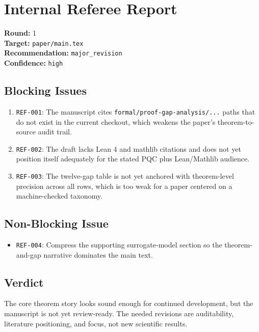\documentclass[11pt]{article}
\begin{document}
\section*{Internal Referee Report}

\textbf{Round:} 1\\
\textbf{Target:} \texttt{paper/main.tex}\\
\textbf{Recommendation:} \texttt{major\_revision}\\
\textbf{Confidence:} \texttt{high}

\subsection*{Blocking Issues}

\begin{enumerate}
\item \texttt{REF-001}: The manuscript cites \texttt{formal/proof-gap-analysis/...} paths that do not exist in the current checkout, which weakens the paper's theorem-to-source audit trail.
\item \texttt{REF-002}: The draft lacks Lean 4 and mathlib citations and does not yet position itself adequately for the stated PQC plus Lean/Mathlib audience.
\item \texttt{REF-003}: The twelve-gap table is not yet anchored with theorem-level precision across all rows, which is too weak for a paper centered on a machine-checked taxonomy.
\end{enumerate}

\subsection*{Non-Blocking Issue}

\begin{itemize}
\item \texttt{REF-004}: Compress the supporting surrogate-model section so the theorem-and-gap narrative dominates the main text.
\end{itemize}

\subsection*{Verdict}

The core theorem story looks sound enough for continued development, but the manuscript is not yet review-ready. The needed revisions are auditability, literature positioning, and focus, not new scientific results.
\end{document}
